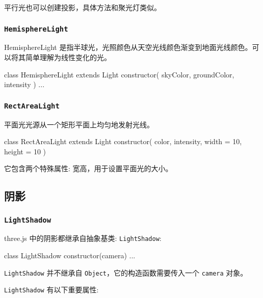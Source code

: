 平行光也可以创建投影，具体方法和聚光灯类似。

\subsubsection*{\texttt{HemisphereLight}}

HemisphereLight 是指半球光，光照颜色从天空光线颜色渐变到地面光线颜色。可以将其简单理解为线性变化的光。

\begin{JavaScript}
class HemisphereLight extends Light {
	constructor( skyColor, groundColor, intensity )
  ...
}
\end{JavaScript}

\subsubsection*{\texttt{RectAreaLight}}

平面光光源从一个矩形平面上均匀地发射光线。

\begin{JavaScript}
class RectAreaLight extends Light {
  constructor( color, intensity, width = 10, height = 10 )
}
\end{JavaScript}

它包含两个特殊属性: 宽高，用于设置平面光的大小。

\subsection{阴影}

\subsubsection*{\texttt{LightShadow}}

three.js 中的阴影都继承自抽象基类: \texttt{LightShadow}:

\begin{JavaScript}
class LightShadow {
  constructor(camera)
  ...
}
\end{JavaScript}

\texttt{LightShadow} 并不继承自 \texttt{Object}，它的构造函数需要传入一个 \texttt{camera} 对象。

\texttt{LightShadow} 有以下重要属性:


